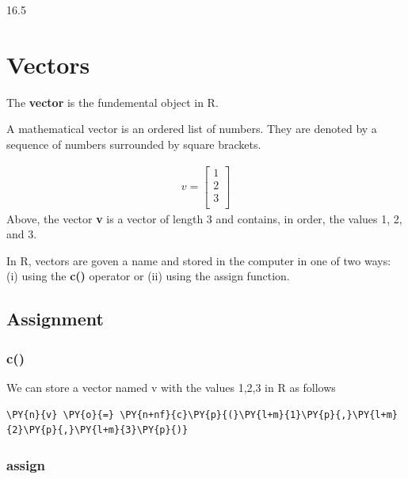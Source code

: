     16.5

    
    \hypertarget{vectors}{%
\section{Vectors}\label{vectors}}

The \textbf{vector} is the fundemental object in R.

A mathematical vector is an ordered list of numbers. They are denoted by
a sequence of numbers surrounded by square brackets.

\begin{align}
    v = \begin{bmatrix}
         1 \\
         2 \\
         3 \\
        \end{bmatrix}
\end{align} Above, the vector \textbf{v} is a vector of length 3 and
contains, in order, the values 1, 2, and 3.

In R, vectors are goven a name and stored in the computer in one of two
ways: (i) using the \textbf{c()} operator or (ii) using the assign
function.

\hypertarget{assignment}{%
\subsection{Assignment}\label{assignment}}

\hypertarget{c}{%
\subsubsection{c()}\label{c}}

We can store a vector named v with the values 1,2,3 in R as follows

    \begin{tcolorbox}[breakable, size=fbox, boxrule=1pt, pad at break*=1mm,colback=cellbackground, colframe=cellborder]
\begin{Verbatim}[commandchars=\\\{\}]
\PY{n}{v} \PY{o}{=} \PY{n+nf}{c}\PY{p}{(}\PY{l+m}{1}\PY{p}{,}\PY{l+m}{2}\PY{p}{,}\PY{l+m}{3}\PY{p}{)}
\end{Verbatim}
\end{tcolorbox}

    \hypertarget{assign}{%
\subsubsection{assign}\label{assign}}

